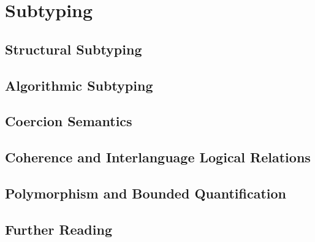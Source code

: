 \chapter{Subtyping}

\section{Structural Subtyping}

\section{Algorithmic Subtyping}

\section{Coercion Semantics}

\section{Coherence and Interlanguage Logical Relations}

\section{Polymorphism and Bounded Quantification}

\section{Further Reading}
